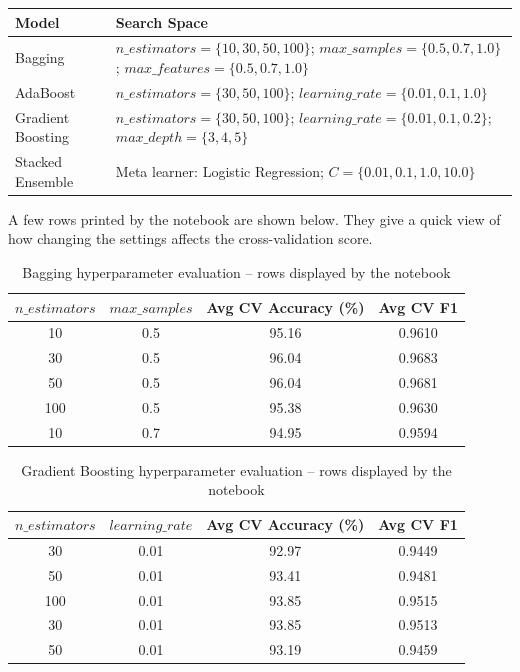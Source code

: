 \documentclass[12pt,a4paper]{article}
\begin{document}
\begin{longtable}{|p{4cm}|p{9.5cm}|}
\hline
\textbf{Model} & \textbf{Search Space} \\ \hline
Bagging & $n\_estimators=\{10,30,50,100\}$; $max\_samples=\{0.5,0.7,1.0\}$; $max\_features=\{0.5,0.7,1.0\}$ \\ \hline
AdaBoost & $n\_estimators=\{30,50,100\}$; $learning\_rate=\{0.01,0.1,1.0\}$ \\ \hline
Gradient Boosting & $n\_estimators=\{30,50,100\}$; $learning\_rate=\{0.01,0.1,0.2\}$; $max\_depth=\{3,4,5\}$ \\ \hline
Stacked Ensemble & Meta learner: Logistic Regression; $C=\{0.01,0.1,1.0,10.0\}$ \\ \hline
\end{longtable}

A few rows printed by the notebook are shown below. They give a quick view of how changing the settings affects the cross-validation score.

\begin{table}[H]
\centering
\caption{Bagging hyperparameter evaluation -- rows displayed by the notebook}
\begin{tabular}{cccc}
\toprule
$n\_estimators$ & $max\_samples$ & Avg CV Accuracy (\%) & Avg CV F1 \\
\midrule
10 & 0.5 & 95.16 & 0.9610 \\
30 & 0.5 & 96.04 & 0.9683 \\
50 & 0.5 & 96.04 & 0.9681 \\
100 & 0.5 & 95.38 & 0.9630 \\
10 & 0.7 & 94.95 & 0.9594 \\
\bottomrule
\end{tabular}
\end{table}

\begin{table}[H]
\centering
\caption{Gradient Boosting hyperparameter evaluation -- rows displayed by the notebook}
\begin{tabular}{cccc}
\toprule
$n\_estimators$ & $learning\_rate$ & Avg CV Accuracy (\%) & Avg CV F1 \\
\midrule
30 & 0.01 & 92.97 & 0.9449 \\
50 & 0.01 & 93.41 & 0.9481 \\
100 & 0.01 & 93.85 & 0.9515 \\
30 & 0.01 & 93.85 & 0.9513 \\
50 & 0.01 & 93.19 & 0.9459 \\
\bottomrule
\end{tabular}
\end{table}
\end{document}
